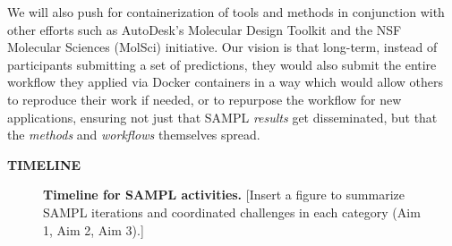 \documentclass[11pt]{article}
\begin{document}
We will also push for containerization of tools and methods in conjunction with other efforts such as AutoDesk's Molecular Design Toolkit and the NSF Molecular Sciences (MolSci) initiative.
Our vision is that long-term, instead of participants submitting a set of predictions, they would also submit the entire workflow they applied via Docker containers in a way which would allow others to reproduce their work if needed, or to repurpose the workflow for new applications, ensuring not just that SAMPL \emph{results} get disseminated, but that the \emph{methods} and \emph{workflows} themselves spread.



{\bf \large TIMELINE} %

\begin{figure}[h]
\begin{centering}

\end{centering}
\vspace{0.1in}
\caption{\footnotesize {\bf Timeline for SAMPL activities.}
{\color{red}[Insert a figure to summarize SAMPL iterations and coordinated challenges in each category (Aim 1, Aim 2, Aim 3).]}
\label{figure:timeline}}
\end{figure}
\end{document}
